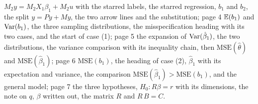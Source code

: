 \documentclass[11pt]{article}
\begin{document}
\begin{transcriptnotes}
        $M_{2}y = M_{2}X_{1}\beta_{1} + M_{2}u$ with the starred labels, the starred
        regression, $b_{1}$ and $b_{2}$, the split $y = Py + My$, the two arrow lines and the substitution;
        page 4 $\mathbb{E}(b_{1})$ and $\operatorname{Var}(b_{1})$, the three sampling distributions, the
        misspecification heading with its two cases, and the start of case (1);
        page 5 the expansion of $\operatorname{Var}(\hat{\beta}_{1})$, the two distributions, the
        variance comparison with its inequality chain, then
        $\text{MSE}(\hat{\theta})$ and $\text{MSE}(\hat{\beta}_{1})$; page 6
        $\text{MSE}(b_{1})$, the heading of case (2), $\hat{\beta}_{1}$ with its
        expectation and variance, the comparison
        $\text{MSE}(\hat{\beta}_{1}) > \text{MSE}(b_{1})$, and the general model;
        page 7 the three hypotheses, $H_{0} : R\beta = r$ with its dimensions, the
        note on $q$, $\beta$ written out, the matrix $R$ and $R\,B = C$.
\end{transcriptnotes}
\end{document}
